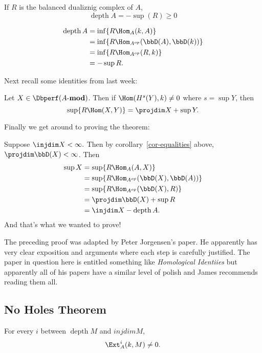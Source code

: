 \documentclass[12pt]{article}
\newcommand*{\Amod}{A\text{-}\mathbf{mod}}
\DeclareMathOperator{\depth}{depth}
\begin{document}
\begin{lem}
	If $R$ is the balanced dualiznig complex of $A$,
	\[\depth A=-\sup(R)\ge 0\]
\end{lem}
\begin{prf}
	\begin{align*}
		\depth A &= \inf\{R\Hom_A(k,A)\}\\
		&= \inf\{R\Hom_{A^{op}}(\bbD(A),\bbD(k))\}\\
		&=\inf\{R\Hom_{A^{op}}(R,k)\}\\
		&= -\sup R.
	\end{align*}
\end{prf}
Next recall some identities from last week:
\begin{lem}
	Let $X\in\Dbperf(\Amod)$. Then if $\Hom(H^s(Y),k)\ne 0$ where $s=\sup Y$, then 
	\[\sup\{R\Hom(X,Y)\}=\projdim X+\sup Y.\]
\end{lem}

Finally we get around to proving the theorem:
\begin{prf}
	Suppose $\injdim X<\infty.$  Then by corollary~\ref{cor-equalities} above, $\projdim\bbD(X)<\infty$. Then
	\begin{align*}
		\sup X &=\sup\{R\Hom_A(A,X)\}\\
		&=\sup\{R\Hom_{A^{op}}(\bbD(X),\bbD(A))\}\\
		&=\sup\{R\Hom_{A^{op}}(\bbD(X),R)\}\\
		&=\projdim\bbD(X)+\sup R\\
		&=\injdim X-\depth A.
	\end{align*}
	And that's what we wanted to prove!
\end{prf}
\begin{rmk}
	The preceding proof was adapted by Peter Jorgensen's paper. He apparently has very clear exposition 
	and arguments where each step is carefully justified. The paper in question here is entitled something like \textit{Homological Identiies}
	but apparently all of his papers have a similar level of polish and James recommends reading them all.
\end{rmk}

\subsection{No Holes Theorem}
\begin{thm}[No Holes]
	For every $i$ between $\depth M$ and $injdim M$,
	\[\Ext_A^i(k,M)\ne 0.\]
\end{thm}
\end{document}
